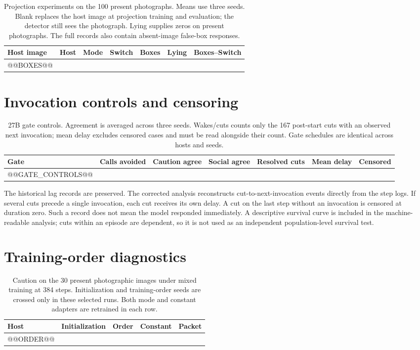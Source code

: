 \documentclass[10pt]{article}
\begin{document}
\begin{table}[htbp]\centering\small
\caption{Projection experiments on the 100 present photographs.
Means use three seeds. Blank replaces the host image at
projection training and evaluation; the detector still sees
the photograph. Lying supplies zeros on present photographs.
The full records also contain absent-image false-box responses.}
\label{tab:boxes}
\begin{tabular}{lllrrrl}\toprule
Host image & Host & Mode & Switch & Boxes & Lying & Boxes--Switch\\\midrule
@@BOXES@@
\bottomrule\end{tabular}
\end{table}

\section{Invocation controls and censoring}
\begin{table}[htbp]\centering\small
\caption{27B gate controls. Agreement is averaged across three
seeds. Wakes/cuts counts only the 167 post-start cuts with an
observed next invocation; mean delay excludes censored cases
and must be read alongside their count. Gate schedules are
identical across hosts and seeds.}\label{tab:gate-controls}
\begin{tabular}{lrrrlrr}\toprule
Gate & Calls avoided & Caution agree & Social agree &
Resolved cuts & Mean delay & Censored\\\midrule
@@GATE_CONTROLS@@
\bottomrule\end{tabular}
\end{table}

The historical lag records are preserved. The corrected analysis
reconstructs cut-to-next-invocation events directly from the step
logs. If several cuts precede a single invocation, each cut
receives its own delay. A cut on the last step without an
invocation is censored at duration zero. Such a record does not
mean the model responded immediately. A descriptive survival
curve is included in the machine-readable analysis; cuts within
an episode are dependent, so it is not used as an independent
population-level survival test.

\section{Training-order diagnostics}
\begin{table}[htbp]\centering\small
\caption{Caution on the 30 present photographic images under
mixed training at 384 steps. Initialization and training-order
seeds are crossed only in these selected runs. Both mode and
constant adapters are retrained in each row.}\label{tab:order}
\begin{tabular}{lrrrr}\toprule
Host & Initialization & Order & Constant & Packet\\\midrule
@@ORDER@@
\bottomrule\end{tabular}
\end{table}
\end{document}
